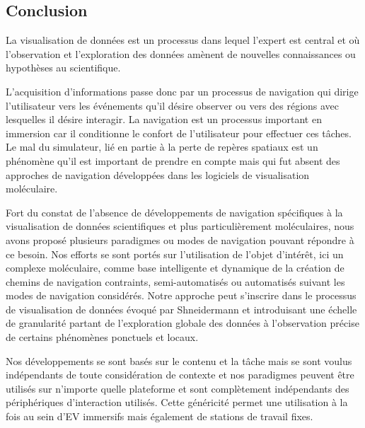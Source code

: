 \subsection{Conclusion}

La visualisation de données est un processus dans lequel l'expert est central et où   l'observation et l'exploration des données amènent de nouvelles connaissances ou hypothèses au scientifique. %

L'acquisition d'informations passe donc par un processus de navigation qui dirige l'utilisateur vers les événements qu'il désire observer ou vers des régions avec lesquelles il désire interagir. La navigation est un processus important en immersion car il conditionne le confort de l'utilisateur pour effectuer ces tâches. Le mal du simulateur, lié en partie à la perte de repères spatiaux est un phénomène qu'il est important de prendre en compte mais qui fut absent des approches de navigation développées dans les logiciels  de visualisation moléculaire. %

Fort du constat de l'absence de développements de navigation spécifiques à la visualisation de données scientifiques et plus particulièrement moléculaires, nous avons proposé plusieurs paradigmes ou modes de navigation pouvant répondre à ce besoin. Nos efforts se sont portés sur l'utilisation de l'objet d'intérêt, ici un complexe moléculaire, comme base intelligente et dynamique de la création de chemins de navigation contraints, semi-automatisés ou automatisés suivant les modes de navigation considérés. Notre approche peut s'inscrire dans le processus de visualisation de données évoqué par Shneidermann et introduisant une échelle de granularité partant de l'exploration globale des données à l'observation précise de certains phénomènes ponctuels et locaux.

Nos développements se sont basés sur le contenu et la tâche mais se sont voulus indépendants de toute considération de contexte et nos paradigmes peuvent être utilisés sur n'importe quelle plateforme et sont complètement indépendants des périphériques d'interaction utilisés. Cette généricité permet une utilisation à la fois au sein d'EV immersifs mais également de stations de travail fixes.

